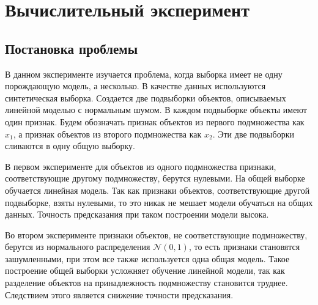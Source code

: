 \documentclass[12pt, twoside]{article}
\begin{document}
\section{Вычислительный эксперимент}

\subsection{Постановка проблемы}

В данном эксперименте изучается проблема, когда выборка имеет не одну порождающую модель, а несколько. В качестве данных используются синтетическая выборка. Создается две подвыборки объектов, описываемых линейной моделью с нормальным шумом. В каждом подвыборке объекты имеют один признак. Будем обозначать признак объектов из первого подмножества как $x_1$, а признак объектов из второго подмножества как $x_2$. Эти две подвыборки сливаются в одну общую выборку. 

В первом эксперименте для объектов из одного подмножества признаки, соответствующие другому подмножеству, берутся нулевыми. На общей выборке обучается линейная модель. Так как признаки объектов, соответствующие другой подвыборке, взяты нулевыми, то это никак не мешает модели обучаться на общих данных. Точность предсказания при таком построении модели высока.

Во втором эксперименте признаки объектов, не соответствующие подмножеству, берутся из нормального распределения $\mathcal{N}(0,1)$, то есть признаки становятся зашумленными, при этом все также используется одна общая модель. Такое построение общей выборки усложняет обучение линейной модели, так как разделение объектов на принадлежность подмножеству становится труднее. Следствием этого является снижение точности предсказания.
\end{document}
